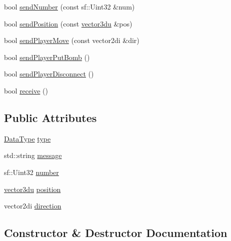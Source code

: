 \begin{DoxyCompactItemize}
\item 
bool \mbox{\hyperlink{class_formatted_socket_a7114490f0ae9b7e7e2f3a2d7a4f64b3c}{send\+Number}} (const sf\+::\+Uint32 \&num)
\item 
bool \mbox{\hyperlink{class_formatted_socket_a6acbe9fe124185752a3ff4f62f73be57}{send\+Position}} (const \mbox{\hyperlink{_utility_8hpp_ac675fa2b6c79d0be47ae76e5d0ce38a8}{vector3du}} \&pos)
\item 
bool \mbox{\hyperlink{class_formatted_socket_ae413116b058bbf12c36f6dcacc202b13}{send\+Player\+Move}} (const vector2di \&dir)
\item 
bool \mbox{\hyperlink{class_formatted_socket_a860290cd091d23c760666d3f03defa15}{send\+Player\+Put\+Bomb}} ()
\item 
bool \mbox{\hyperlink{class_formatted_socket_a4e6b793dfa9397dae4c3dcd56cc63144}{send\+Player\+Disconnect}} ()
\item 
bool \mbox{\hyperlink{class_formatted_socket_aa2beb732bfaf5bba6a424f16b6ffa41e}{receive}} ()
\end{DoxyCompactItemize}
\subsection*{Public Attributes}
\begin{DoxyCompactItemize}
\item 
\mbox{\hyperlink{_formatted_socket_8hpp_ad8ed01ff3ff33333d8e19db4d2818bb6}{Data\+Type}} \mbox{\hyperlink{class_formatted_socket_a167e37871d020747121819c2bdc746e5}{type}}
\item 
std\+::string \mbox{\hyperlink{class_formatted_socket_ae111688faa88e06c0f3ab88ff75f1999}{message}}
\item 
sf\+::\+Uint32 \mbox{\hyperlink{class_formatted_socket_a7bc9148b0076701f1f11af04e56f2b5c}{number}}
\item 
\mbox{\hyperlink{_utility_8hpp_ac675fa2b6c79d0be47ae76e5d0ce38a8}{vector3du}} \mbox{\hyperlink{class_formatted_socket_a28cddb0857e5bcd570087aa81dd25722}{position}}
\item 
vector2di \mbox{\hyperlink{class_formatted_socket_a8dd9c5e8aa0ea113bb94cc516b548373}{direction}}
\end{DoxyCompactItemize}


\subsection{Constructor \& Destructor Documentation}
\mbox{\label{class_formatted_socket_a0c1d95da4ef859d754e634df0d2d80a2}} 
